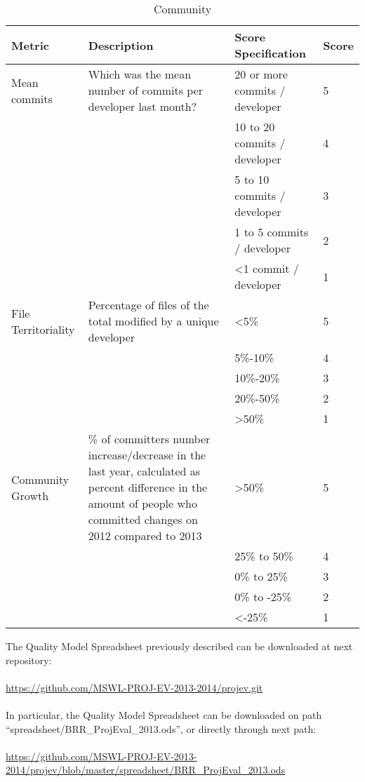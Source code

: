 \documentclass[11pt]{article}
\begin{document}
\begin{table}[H]
  \begin{center}
    \begin{tabular}{ | p{3cm} | p{5cm} | p{3cm} | l | }
    \toprule
    \textbf{Metric} & \textbf{Description} & \textbf{Score Specification} & \textbf{Score} \\
    \hline
    Mean commits & Which was the mean number of commits per developer last month? & 20 or more commits / developer & 5 \\ \cline{3-3} \cline{4-4}
    & & 10 to 20 commits / developer & 4 \\ \cline{3-3}\cline{4-4}
    & & 5 to 10 commits / developer & 3 \\ \cline{3-3}\cline{4-4}
    & & 1 to 5 commits / developer & 2 \\ \cline{3-3}\cline{4-4}
    & & \textless 1 commit / developer & 1 \\ 
    \hline
    File Territoriality & Percentage of files of the total modified by a unique developer & \textless 5\% & 5 \\ \cline{3-3} \cline{4-4}
    & & 5\%-10\%  & 4 \\ \cline{3-3}\cline{4-4}
    & & 10\%-20\% & 3 \\ \cline{3-3}\cline{4-4}
    & & 20\%-50\% & 2 \\ \cline{3-3}\cline{4-4}
    & & \textgreater 50\% & 1 \\ 
    \hline
    Community Growth & \% of committers number increase/decrease in the last year, calculated as percent difference in the amount of people who committed changes on 2012 compared to 2013 & \textgreater50\% & 5 \\ \cline{3-3} \cline{4-4}
    & & 25\% to 50\% & 4 \\ \cline{3-3}\cline{4-4}
    & & 0\% to 25\%  & 3 \\ \cline{3-3}\cline{4-4}
    & & 0\% to -25\% & 2 \\ \cline{3-3}\cline{4-4}
    & & \textless-25\%       & 1 \\ 
    \bottomrule
    \end{tabular}
    \caption{Community}
    \label{tab:community}
  \end{center}
\end{table}
The Quality Model Spreadsheet previously described can be downloaded at next repository:\\
\\
\url{https://github.com/MSWL-PROJ-EV-2013-2014/projev.git}\\
\\
In particular, the Quality Model Spreadsheet can be downloaded on path ``spreadsheet/BRR\_ProjEval\_2013.ods'', or directly through next path:\\
\\
\url{https://github.com/MSWL-PROJ-EV-2013-2014/projev/blob/master/spreadsheet/BRR_ProjEval_2013.ods}
\end{document}
